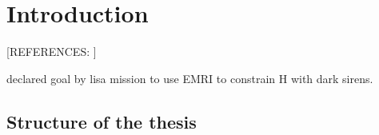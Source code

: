 \chapter*{Introduction}

 [REFERENCES: ]

declared goal by lisa mission to use EMRI to constrain H with dark sirens.

\section*{Structure of the thesis}
